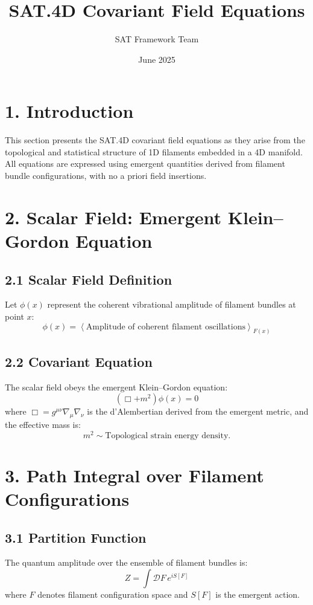 \documentclass[12pt]{article}
\title{\textbf{SAT.4D Covariant Field Equations}}
\author{SAT Framework Team}
\date{June 2025}
\begin{document}
\maketitle

\section*{1. Introduction}

This section presents the SAT.4D covariant field equations as they arise from the topological and statistical structure of 1D filaments embedded in a 4D manifold. All equations are expressed using emergent quantities derived from filament bundle configurations, with no a priori field insertions.

\section*{2. Scalar Field: Emergent Klein--Gordon Equation}

\subsection*{2.1 Scalar Field Definition}
Let $\phi(x)$ represent the coherent vibrational amplitude of filament bundles at point $x$:
\[
\phi(x) = \left\langle \text{Amplitude of coherent filament oscillations} \right\rangle_{F(x)}
\]

\subsection*{2.2 Covariant Equation}
The scalar field obeys the emergent Klein--Gordon equation:
\[
\left( \Box + m^2 \right) \phi(x) = 0
\]
where $\Box = g^{\mu\nu} \nabla_\mu \nabla_\nu$ is the d'Alembertian derived from the emergent metric, and the effective mass is:
\[
m^2 \sim \text{Topological strain energy density}.
\]

\section*{3. Path Integral over Filament Configurations}

\subsection*{3.1 Partition Function}
The quantum amplitude over the ensemble of filament bundles is:
\[
Z = \int \mathcal{D}F \, e^{i S[F]}
\]
where $F$ denotes filament configuration space and $S[F]$ is the emergent action.
\end{document}
